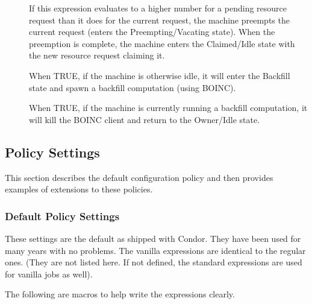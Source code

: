 \begin{description}
\item[] If this expression evaluates to a higher number for
  a pending resource request than it does for the current request, the
  machine preempts the current request (enters the
  Preempting/Vacating state).  When the preemption is complete, the
  machine enters the Claimed/Idle state with the new resource
  request claiming it.

\item[] When TRUE, if the machine is otherwise
  idle, it will enter the Backfill state and spawn a backfill
  computation (using BOINC).

\item[] When TRUE, if the machine is currently
  running a backfill computation, it will kill the BOINC client and
  return to the Owner/Idle state.

\end{description}

\subsection{\label{sec:Policy-Settings}Policy Settings}

This section describes the default configuration
policy and then provides examples of extensions to these
policies.

\subsubsection{\label{sec:Default-Policy}Default Policy Settings}

These settings are the default as shipped with Condor.  They have been
used for many years with no problems.  The vanilla expressions are
identical to the regular ones. (They are not listed here.  If
not defined, the standard expressions are used for vanilla jobs
as well).

The following are macros to help write the expressions
clearly.

